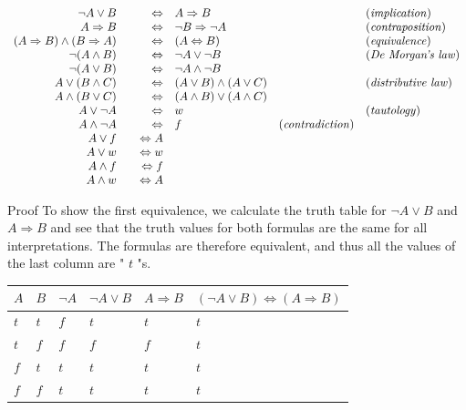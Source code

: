 \documentclass[10pt]{book}
\begin{document}
$$
\begin{array}{rlrlrl}
\neg A \vee B & & \Leftrightarrow & A \Rightarrow B & & \text{(\emph{implication})} \\
A \Rightarrow B & & \Leftrightarrow & \neg B \Rightarrow \neg A & & \text{(\emph{contraposition})} \\
(A \Rightarrow B) \wedge(B \Rightarrow A) & & \Leftrightarrow & (A \Leftrightarrow B) & & \text{(\emph{equivalence})} \\
\neg(A \wedge B) & & \Leftrightarrow & \neg A \vee \neg B & & \text{(\emph{De Morgan's law})} \\
\neg(A \vee B) & & \Leftrightarrow & \neg A \wedge \neg B & & \\
A \vee(B \wedge C) & & \Leftrightarrow & (A \vee B) \wedge(A \vee C) & & \text{(\emph{distributive law})} \\
A \wedge(B \vee C) & & \Leftrightarrow & (A \wedge B) \vee(A \wedge C) & & \\
A \vee \neg A & & \Leftrightarrow & w & & \text{(\emph{tautology})} \\
A \wedge \neg A & & \Leftrightarrow & f & \text{(\emph{contradiction})} \\
A \vee f & & \Leftrightarrow A & & \\
A \vee w & & \Leftrightarrow w & & \\
A \wedge f & & \Leftrightarrow f & & \\
A \wedge w & & \Leftrightarrow A & &
\end{array}
$$

Proof To show the first equivalence, we calculate the truth table for $\neg A \vee B$ and $A \Rightarrow B$ and see that the truth values for both formulas are the same for all interpretations. The formulas are therefore equivalent, and thus all the values of the last column are " $t$ "s.

\begin{center}
\begin{tabular}{llllll}
\hline
$A$ & $B$ & $\neg A$ & $\neg A \vee B$ & $A \Rightarrow B$ & $(\neg A \vee B) \Leftrightarrow(A \Rightarrow B)$ \\
\hline
$t$ & $t$ & $f$ & $t$ & $t$ & $t$ \\
\hline
$t$ & $f$ & $f$ & $f$ & $f$ & $t$ \\
\hline
$f$ & $t$ & $t$ & $t$ & $t$ & $t$ \\
\hline
$f$ & $f$ & $t$ & $t$ & $t$ & $t$ \\
\hline
\end{tabular}
\end{center}
\end{document}
